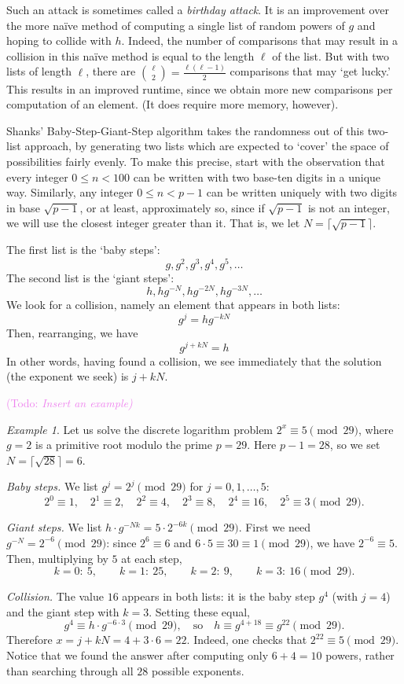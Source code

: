 \documentclass{article}
\theoremstyle{plain}
\theoremstyle{definition}
\theoremstyle{remark}
\newtheorem{example}[theorem]{Example}
\numberwithin{theorem}{section}
\newcommand{\KS}[1]{\textcolor{violet}{{\sf (Todo:} {\sl{#1})}}}
\newcommand{\KS}[1]{}
\begin{document}
Such an attack is sometimes called a \emph{birthday attack}.  It is an improvement over the more na\"ive method of computing a single list of random powers of $g$ and hoping to collide with $h$.  Indeed, the number of comparisons that may result in a collision in this na\"ive method is equal to the length $\ell$ of the list.  But with two lists of length $\ell$, there are ${\ell\choose 2} = \frac{\ell(\ell-1)}{2}$ comparisons that may `get lucky.'  This results in an improved runtime, since we obtain more new comparisons per computation of an element.  (It does require more memory, however).

Shanks' Baby-Step-Giant-Step algorithm takes the randomness out of this two-list approach, by generating two lists which are expected to `cover' the space of possibilities fairly evenly.  To make this precise, start with the observation that every integer $0 \le n < 100$ can be written with two base-ten digits in a unique way.  Similarly, any integer $0 \le n < p-1$ can be written uniquely with two digits in base $\sqrt{p-1}$, or at least, approximately so, since if $\sqrt{p-1}$ is not an integer, we will use the closest integer greater than it.  That is, we let $N = \lceil \sqrt{p-1} \rceil$.

The first list is the `baby steps':
\[
	g, g^2, g^3, g^4, g^5, \ldots
\]
The second list is the `giant steps':
\[
	h, hg^{-N}, hg^{-2N}, hg^{-3N}, \ldots
\]
We look for a collision, namely an element that appears in both lists:
\[
	g^j = hg^{-kN}
\]
Then, rearranging, we have
\[
	g^{j+kN} = h
\]
In other words, having found a collision, we see immediately that the solution (the exponent we seek) is $j+kN$.

\KS{Insert an example}

\begin{example}
Let us solve the discrete logarithm problem $2^x \equiv 5 \pmod{29}$, where $g = 2$ is a primitive root modulo the prime $p = 29$.  Here $p - 1 = 28$, so we set $N = \lceil \sqrt{28} \rceil = 6$.

\emph{Baby steps.}  We list $g^j = 2^j \pmod{29}$ for $j = 0, 1, \ldots, 5$:
\[
2^0 \equiv 1, \quad 2^1 \equiv 2, \quad 2^2 \equiv 4, \quad 2^3 \equiv 8, \quad 2^4 \equiv 16, \quad 2^5 \equiv 3 \pmod{29}.
\]

\emph{Giant steps.}  We list $h \cdot g^{-Nk} = 5 \cdot 2^{-6k} \pmod{29}$.  First we need $g^{-N} = 2^{-6} \pmod{29}$: since $2^6 \equiv 6$ and $6 \cdot 5 \equiv 30 \equiv 1 \pmod{29}$, we have $2^{-6} \equiv 5$.  Then, multiplying by $5$ at each step,
\[
k = 0:\ 5, \qquad k = 1:\ 25, \qquad k = 2:\ 9, \qquad k = 3:\ 16 \pmod{29}.
\]

\emph{Collision.}  The value $16$ appears in both lists: it is the baby step $g^4$ (with $j = 4$) and the giant step with $k = 3$.  Setting these equal,
\[
g^{4} \equiv h \cdot g^{-6 \cdot 3} \pmod{29}, \quad \text{so} \quad h \equiv g^{4 + 18} \equiv g^{22} \pmod{29}.
\]
Therefore $x = j + kN = 4 + 3 \cdot 6 = 22$.  Indeed, one checks that $2^{22} \equiv 5 \pmod{29}$.  Notice that we found the answer after computing only $6 + 4 = 10$ powers, rather than searching through all $28$ possible exponents.
\end{example}
\end{document}
